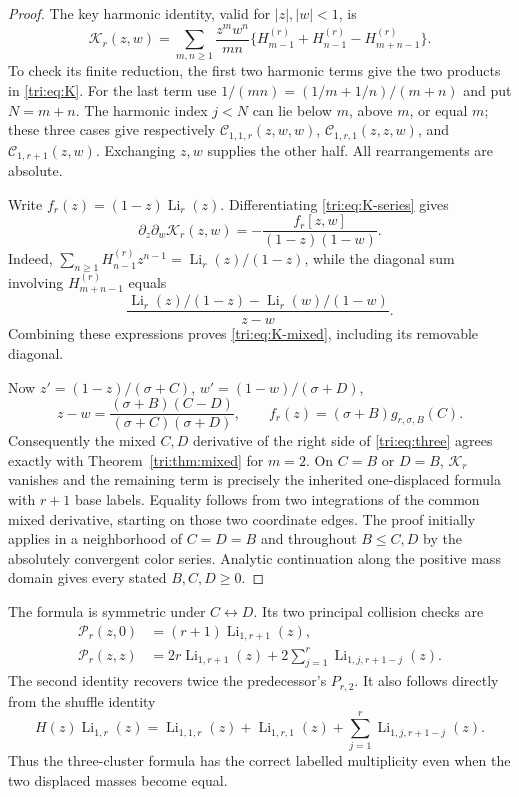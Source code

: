 \begin{proof}
The key harmonic identity, valid for $|z|,|w|<1$, is
\begin{equation}\label{tri:eq:K-series}
 \mathcal K_r(z,w)
  =\sum_{m,n\ge1}\frac{z^mw^n}{mn}
    \{H_{m-1}^{(r)}+H_{n-1}^{(r)}-H_{m+n-1}^{(r)}\}.
\end{equation}
To check its finite reduction, the first two harmonic terms give
the two products in \eqref{tri:eq:K}. For the last term use
$1/(mn)=(1/m+1/n)/(m+n)$ and put $N=m+n$. The harmonic index
$j<N$ can lie below $m$, above $m$, or equal $m$; these three
cases give respectively
$\mathcal C_{1,1,r}(z,w,w)$,
$\mathcal C_{1,r,1}(z,z,w)$, and
$\mathcal C_{1,r+1}(z,w)$. Exchanging $z,w$ supplies the other
half. All rearrangements are absolute.

Write $f_r(z)=(1-z)\operatorname{Li}_r(z)$. Differentiating
\eqref{tri:eq:K-series} gives
\begin{equation}\label{tri:eq:K-mixed}
 \partial_z\partial_w\mathcal K_r(z,w)
   =-\frac{f_r[z,w]}{(1-z)(1-w)}.
\end{equation}
Indeed,
$\sum_{n\ge1}H_{n-1}^{(r)}z^{n-1}=
\operatorname{Li}_r(z)/(1-z)$, while the diagonal sum involving
$H_{m+n-1}^{(r)}$ equals
\[
 \frac{\operatorname{Li}_r(z)/(1-z)
                    -\operatorname{Li}_r(w)/(1-w)}{z-w}.
\]
Combining these expressions proves \eqref{tri:eq:K-mixed},
including its removable diagonal.

Now $z'=(1-z)/(\sigma+C)$,
$w'=(1-w)/(\sigma+D)$,
\[
 z-w=\frac{(\sigma+B)(C-D)}{(\sigma+C)(\sigma+D)},
 \qquad f_r(z)=(\sigma+B)g_{r,\sigma,B}(C).
\]
Consequently the mixed $C,D$ derivative of the right side of
\eqref{tri:eq:three} agrees exactly with
Theorem~\ref{tri:thm:mixed} for $m=2$. On $C=B$ or $D=B$,
$\mathcal K_r$ vanishes and the remaining term is precisely
the inherited one-displaced formula with $r+1$ base labels.
Equality follows from two integrations of the common mixed
derivative, starting on those two coordinate edges. The proof
initially applies in a neighborhood of $C=D=B$ and throughout
$B\le C,D$ by the absolutely convergent color series. Analytic
continuation along the positive mass domain gives every stated
$B,C,D\ge0$.
\end{proof}

The formula is symmetric under $C\leftrightarrow D$. Its two
principal collision checks are
\begin{align}
 \mathcal P_r(z,0)&=(r+1)\operatorname{Li}_{1,r+1}(z),
                      \label{tri:eq:axis}\\
 \mathcal P_r(z,z)&=2r\operatorname{Li}_{1,r+1}(z)
       +2\sum_{j=1}^{r}\operatorname{Li}_{1,j,r+1-j}(z).
                      \label{tri:eq:diagonal}
\end{align}
The second identity recovers twice the predecessor's $P_{r,2}$.
It also follows directly from the shuffle identity
\[
 H(z)\operatorname{Li}_{1,r}(z)
  =\operatorname{Li}_{1,1,r}(z)
      +\operatorname{Li}_{1,r,1}(z)
      +\sum_{j=1}^{r}\operatorname{Li}_{1,j,r+1-j}(z).
\]
Thus the three-cluster formula has the correct labelled
multiplicity even when the two displaced masses become equal.

